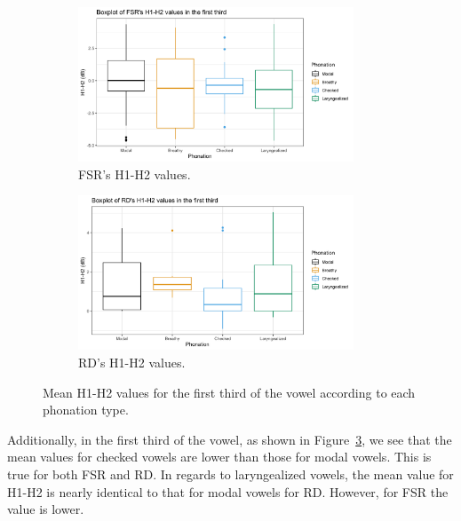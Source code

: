\documentclass[12pt, letterpaper]{article}
\begin{document}
\begin{figure}[!ht]
	\centering
	\begin{subfigure}{.5\textwidth}
		\centering
		\includegraphics[width=0.9\textwidth]{Images/mean_FSR_h1h2_1st.png}
		\caption{FSR's H1-H2 values.}
		\label{fig:FSRh1h2first} 
	\end{subfigure}%
	\begin{subfigure}{.5\textwidth}
		\centering
		\includegraphics[width=0.9\textwidth]{Images/mean_RD_h1h2_1st.png}
		\caption{RD's H1-H2 values.}
		\label{fig:RDh1h2first} 
	\end{subfigure}
	\caption{Mean H1-H2 values for the first third of the vowel according to each phonation type. }
	\label{fig:h1h2first}
\end{figure}

Additionally, in the first third of the vowel, as shown in Figure~\ref{fig:h1h2first}, we see that the mean values for checked vowels are lower than those for modal vowels. This is true for both FSR and RD. In regards to laryngealized vowels, the mean value for H1-H2 is nearly identical to that for modal vowels for RD. However, for FSR the value is lower.
\end{document}
